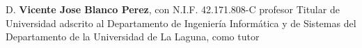 \documentclass[spanish,a4paper,twoside]{report}
\begin{document}




            



\newpage{\pagestyle{empty}\cleardoublepage}

D. \textbf{Vicente Jose Blanco Perez}, con N.I.F. 42.171.808-C profesor Titular de Universidad adscrito al Departamento de Ingeniería Informática y de Sistemas del Departamento de la Universidad de La Laguna, como tutor \\
\vspace*{0.6in}
\end{document}
